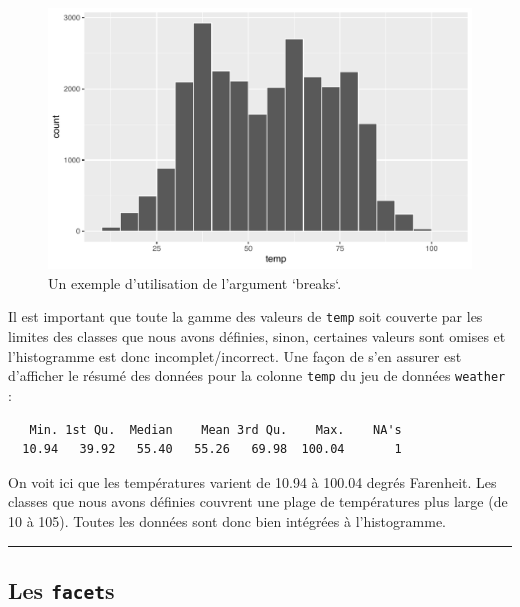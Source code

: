 \documentclass[a4paperpaper,]{article}
\newenvironment{Shaded}{\begin{snugshade}}{\end{snugshade}}
\newcommand{\KeywordTok}[1]{\textcolor[rgb]{0.12,0.11,0.11}{\textbf{#1}}}
\newcommand{\NormalTok}[1]{\textcolor[rgb]{0.12,0.11,0.11}{#1}}
\newcommand{\OperatorTok}[1]{\textcolor[rgb]{0.12,0.11,0.11}{#1}}
\begin{document}
\begin{figure}[htpb]

{\centering \includegraphics[width=0.9\linewidth]{figure/break-1} 

}

\caption{Un exemple d'utilisation de l'argument `breaks`.}\label{fig:break}
\end{figure}

Il est important que toute la gamme des valeurs de \texttt{temp} soit couverte par les limites des classes que nous avons définies, sinon, certaines valeurs sont omises et l'histogramme est donc incomplet/incorrect. Une façon de s'en assurer est d'afficher le résumé des données pour la colonne \texttt{temp} du jeu de données \texttt{weather} :

\begin{Shaded}
\end{Shaded}

\begin{verbatim}
   Min. 1st Qu.  Median    Mean 3rd Qu.    Max.    NA's 
  10.94   39.92   55.40   55.26   69.98  100.04       1 
\end{verbatim}

On voit ici que les températures varient de 10.94 à 100.04 degrés Farenheit. Les classes que nous avons définies couvrent une plage de températures plus large (de 10 à 105). Toutes les données sont donc bien intégrées à l'histogramme.

\begin{center}\rule{0.5\linewidth}{\linethickness}\end{center}

\hypertarget{facets}{%
\subsection{\texorpdfstring{Les \texttt{facet}s}{Les facets}}\label{facets}}
\end{document}

